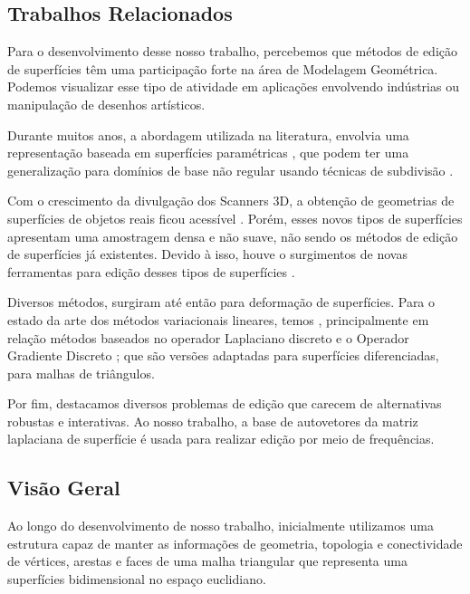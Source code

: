 \subsection{Trabalhos Relacionados}

Para o desenvolvimento desse nosso trabalho, percebemos que métodos de edição de superfícies têm uma participação forte na área de Modelagem Geométrica. Podemos visualizar esse tipo de atividade em aplicações envolvendo indústrias ou manipulação de desenhos artísticos.

Durante muitos anos, a abordagem utilizada na literatura, envolvia uma representação baseada em superfícies paramétricas \cite{FarinG}, que podem ter uma generalização para domínios de base não regular usando técnicas de subdivisão \cite{SCHRZORI}.

Com o crescimento da divulgação dos Scanners 3D, a obtenção de geometrias de superfícies de objetos reais ficou acessível \cite{NEUGEBAUER}. Porém, esses novos tipos de superfícies apresentam uma amostragem densa e não suave, não sendo os métodos de edição de superfícies já existentes. Devido à isso, houve o surgimentos de novas ferramentas para edição desses tipos de superfícies .

Diversos métodos, surgiram até então para deformação de superfícies. Para o estado da arte dos métodos variacionais lineares, temos  \cite{Olga}, principalmente em relação métodos baseados no operador Laplaciano discreto \cite{Lang} e o Operador Gradiente Discreto \cite{Yu:2004}; que são versões adaptadas para superfícies diferenciadas, para malhas de triângulos.

Por fim, destacamos diversos problemas de edição que carecem de alternativas robustas e interativas. Ao nosso trabalho, a base de autovetores da matriz laplaciana de superfície é usada para realizar edição por meio de frequências.

\subsection{Visão Geral}

Ao longo do desenvolvimento de nosso trabalho, inicialmente utilizamos uma estrutura \cite{che05} capaz de manter as informações de geometria, topologia e conectividade de vértices, arestas e faces de uma malha triangular que representa uma superfícies bidimensional no espaço euclidiano.


